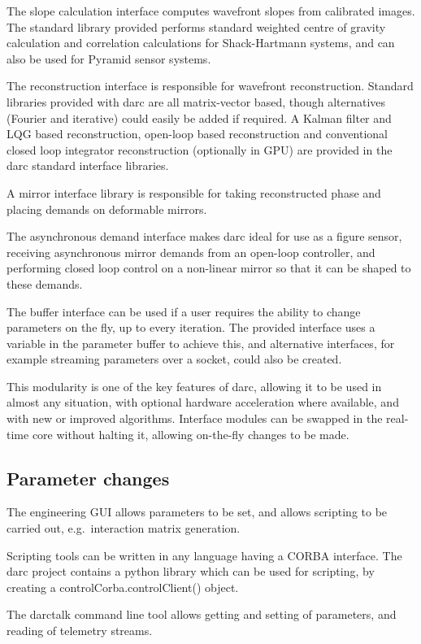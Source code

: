 \documentclass[a4,10pt]{article}
\begin{document}
The slope calculation interface computes wavefront slopes from
calibrated images.  The standard library provided performs standard
weighted centre of gravity calculation and correlation calculations
for Shack-Hartmann systems, and can also be used for Pyramid sensor
systems.

The reconstruction interface is responsible for wavefront
reconstruction.  Standard libraries provided with darc are all
matrix-vector based, though alternatives (Fourier and iterative) could
easily be added if required.  A Kalman filter and LQG based reconstruction,
open-loop based reconstruction and conventional closed loop integrator
reconstruction (optionally in GPU) are provided in the darc standard
interface libraries.

A mirror interface library is responsible for taking reconstructed
phase and placing demands on deformable mirrors.  

The asynchronous demand interface makes darc ideal for use as a figure
sensor, receiving asynchronous mirror demands from an open-loop
controller, and performing closed loop control on a non-linear mirror
so that it can be shaped to these demands.

The buffer interface can be used if a user requires the ability to
change parameters on the fly, up to every iteration.  The provided
interface uses a variable in the parameter buffer to achieve this, and
alternative interfaces, for example streaming parameters over a
socket, could also be created.

This modularity is one of the key features of darc, allowing it to be
used in almost any situation, with optional hardware acceleration
where available, and with new or improved algorithms.  Interface
modules can be swapped in the real-time core without halting it,
allowing on-the-fly changes to be made.



\subsection{Parameter changes}
The engineering GUI allows parameters to be set, and allows scripting
to be carried out, e.g.\ interaction matrix generation.

Scripting tools can be written in any language having a CORBA
interface.  The darc project contains a python library which can be
used for scripting, by creating a controlCorba.controlClient() object.

The darctalk command line tool allows getting and setting of
parameters, and reading of telemetry streams.
\end{document}
